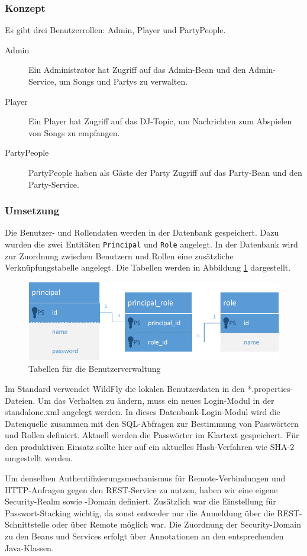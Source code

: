 \subsubsection{Konzept}
Es gibt drei Benutzerrollen: Admin, Player und PartyPeople.
\begin{description}
	\item[Admin] Ein Administrator hat Zugriff auf das Admin-Bean und den Admin-Service, um Songs und Partys zu verwalten.
	\item[Player] Ein Player hat Zugriff auf das DJ-Topic, um Nachrichten zum Abspielen von Songs zu empfangen.
	\item[PartyPeople] PartyPeople haben als Gäste der Party Zugriff auf das Party-Bean und den Party-Service.
\end{description}

\subsubsection{Umsetzung}
Die Benutzer- und Rollendaten werden in der Datenbank gespeichert. Dazu wurden die zwei Entitäten \texttt{Principal} und \texttt{Role} angelegt. In der Datenbank wird zur Zuordnung zwischen Benutzern und Rollen eine zusätzliche Verknüpfungstabelle angelegt. Die Tabellen werden in Abbildung \ref{fig:BenutzerRollen} dargestellt.

\begin{figure}[tbh]
\centering
\includegraphics[width=0.8\linewidth]{Bilder/BenutzerRollen}
\caption{Tabellen für die Benutzerverwaltung}
\label{fig:BenutzerRollen}
\end{figure}

Im Standard verwendet WildFly die lokalen Benutzerdaten in den *.properties-Dateien. Um das Verhalten zu ändern, muss ein neues Login-Modul in der standalone.xml angelegt werden. In dieses Datenbank-Login-Modul wird die Datenquelle zusammen mit den SQL-Abfragen zur Bestimmung von Passwörtern und Rollen definiert. Aktuell werden die Passwörter im Klartext gespeichert. Für den produktiven Einsatz sollte hier auf ein aktuelles Hash-Verfahren wie SHA-2 umgestellt werden.

Um denselben Authentifizierungsmechanismus für Remote-Verbindungen und HTTP-Anfragen gegen den REST-Service zu nutzen, haben wir eine eigene Security-Realm sowie -Domain definiert. Zusätzlich war die Einstellung für Passwort-Stacking wichtig, da sonst entweder nur die Anmeldung über die REST-Schnittstelle oder über Remote möglich war. Die Zuordnung der Security-Domain zu den Beans und Services erfolgt über Annotationen an den entsprechenden Java-Klassen. 

